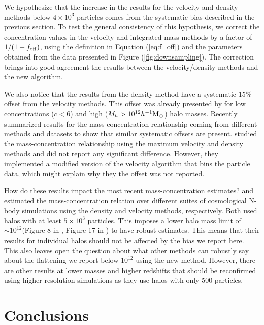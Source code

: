 \documentclass{emulateapj}
\newcommand{\hMsun}{{\ifmmode{h^{-1}{\rm {M_{\odot}}}}\else{$h^{-1}{\rm{M_{\odot}}}$}\fi}}
\newcommand{\Msun}{{\ifmmode{{\rm {M_{\odot}}}}\else{${\rm{M_{\odot}}}$}\fi}}
\begin{document}
We hypothesize that the increase in the results for the velocity
and density methods below $4\times 10^{3}$ particles comes from the
systematic bias described in the previous section.  
To test the general consistency of this hypothesis, we correct the
concentration values in the velocity and integrated mass methods by a
factor of $1/(1+f_{\rm  off})$, using the definition in Equation
(\ref{eq:f_off}) and the  
parameters obtained from the data presented in Figure
(\ref{fig:downsampling}).  
The correction brings into good agreement the results between the
velocity/density methods and the new algorithm.

We also notice that the results from the density method have a
systematic $15\%$ offset from the velocity methods.  
This offset was already presented by \cite{Prada2012} for low
concentrations ($c<6$) and high ($M_h>10^{12}\hMsun$) halo masses.  
Recently \citep{Klypin2016} summarized results for the
mass-concentration relationship coming from different methods and
datasets to show that similar systematic offsets are present.
\citep{2014MNRAS.441.3359D} studied the mass-concentration
relationship using the maximum velocity and density methods and did
not report any significant difference. 
However, they implemented a modified version of the velocity algorithm
that bins the particle data, which might explain why they the offset
was not reported.

How do these results impact the most recent mass-concentration estimates? 
\cite{Ludlow2016} and \cite{Klypin2016} estimated the mass-concentration
relation over different suites of cosmological N-body simulations using the
density and velocity methods, respectively. 
Both used halos with at least $5\times 10^{3}$ particles.
This imposes a lower halo mass limit of $\sim 10^{12}$\hMsun (Figure 8
in \cite{Ludlow2016}, Figure 17 in \cite{Klypin2016}) to have robust
estimates. 
This means that their results for individual halos should not be
affected by the bias we report here.
This also leaves open the question about what other methods
can robustly say about the flattening we report below $10^{12}$\Msun
using the new method. 
However, there are other results at lower masses and higher redshifts
\citep[i.e.][]{Prada2012} that should be reconfirmed using higher resolution
simulations as they use halos with only $500$ particles. 


\section{Conclusions}
\label{sec:conclusions}
\end{document}
